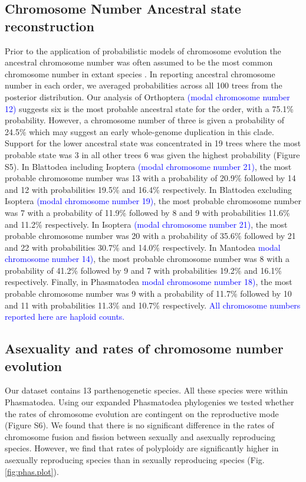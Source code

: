 \documentclass[]{rsos}%
\begin{document}
\subsection{Chromosome Number Ancestral state reconstruction}
Prior to the application of probabilistic models of chromosome evolution the ancestral chromosome number was often assumed to be the most common chromosome number in extant species \cite{white1973}.
In reporting ancestral chromosome number in each order, we averaged probabilities across all 100 trees from the posterior distribution. 
Our analysis of Orthoptera \textcolor{blue}{(modal chromosome number 12)} suggests six is the most probable ancestral state for the order, with a 75.1\% probability.
However, a chromosome number of three is given a probability of 24.5\% which may suggest an early whole-genome duplication in this clade.
Support for the lower ancestral state was concentrated in 19 trees where the most probable state was 3 in all other trees 6 was given the highest probability (Figure S5).
In Blattodea including Isoptera \textcolor{blue}{(modal  chromosome number 21)}, the most probable chromosome number was 13 with a probability of 20.9\% followed by 14 and 12 with probabilities 19.5\% and 16.4\% respectively. 
In Blattodea excluding Isoptera \textcolor{blue}{(modal chromosome number 19)}, the most probable chromosome number was 7 with a probability of 11.9\% followed by 8 and 9 with probabilities 11.6\% and 11.2\% respectively.
In Isoptera \textcolor{blue}{(modal chromosome number 21)}, the most probable chromosome number was 20 with a probability of 35.6\% followed by 21 and 22 with probabilities 30.7\% and 14.0\% respectively.
In Mantodea \textcolor{blue}{modal chromosome number 14)}, the most probable chromosome number was 8 with a probability of 41.2\% followed by 9 and 7 with probabilities 19.2\% and 16.1\% respectively.
Finally, in Phasmatodea \textcolor{blue}{modal chromosome number 18)}, the most probable chromosome number was 9 with a probability of 11.7\% followed by 10 and 11 with probabilities 11.3\% and 10.7\% respectively.
\textcolor{blue}{All chromosome numbers reported here are haploid counts.}

\subsection{Asexuality and rates of chromosome number evolution}
Our dataset contains 13 parthenogenetic species.
All these species were within Phasmatodea.
Using our expanded Phasmatodea phylogenies we tested whether the rates of chromosome evolution are contingent on the reproductive mode (Figure S6).
We found that there is no significant difference in the rates of chromosome fusion and fission between sexually and asexually reproducing species.
However, we find that rates of polyploidy are significantly higher in asexually reproducing species than in sexually reproducing species (Fig. \ref{fig:phas.plot}).
\end{document}
